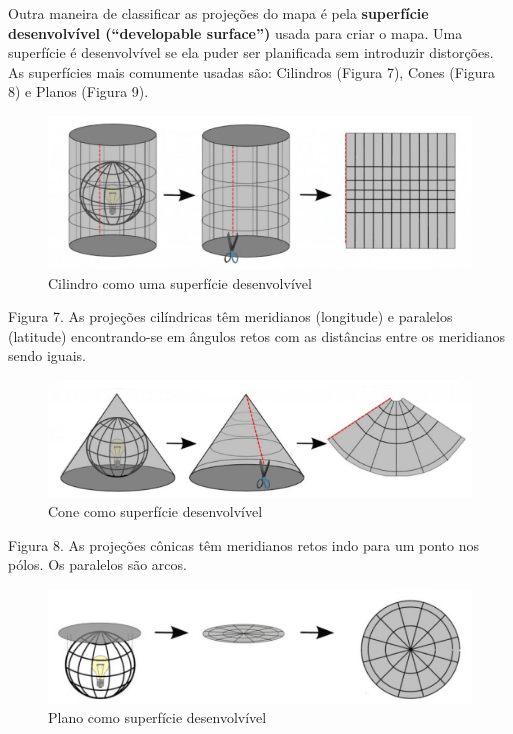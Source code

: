 \documentclass[
]{krantz}
\begin{document}
Outra maneira de classificar as projeções do mapa é pela \textbf{superfície desenvolvível (``developable surface'')} usada para criar o mapa. Uma superfície é desenvolvível se ela puder ser planificada sem introduzir distorções. As superfícies mais comumente usadas são: Cilindros (Figura 7), Cones (Figura 8) e Planos (Figura 9).

\begin{figure}
\centering
\includegraphics{media/modulo0/cylinder.png}
\caption{Cilindro como uma superfície desenvolvível}
\end{figure}

Figura 7. As projeções cilíndricas têm meridianos (longitude) e paralelos (latitude) encontrando-se em ângulos retos com as distâncias entre os meridianos sendo iguais.

\begin{figure}
\centering
\includegraphics{media/modulo0/cone.png}
\caption{Cone como superfície desenvolvível}
\end{figure}

Figura 8. As projeções cônicas têm meridianos retos indo para um ponto nos pólos. Os paralelos são arcos.

\begin{figure}
\centering
\includegraphics{media/modulo0/plane.png}
\caption{Plano como superfície desenvolvível}
\end{figure}
\end{document}
